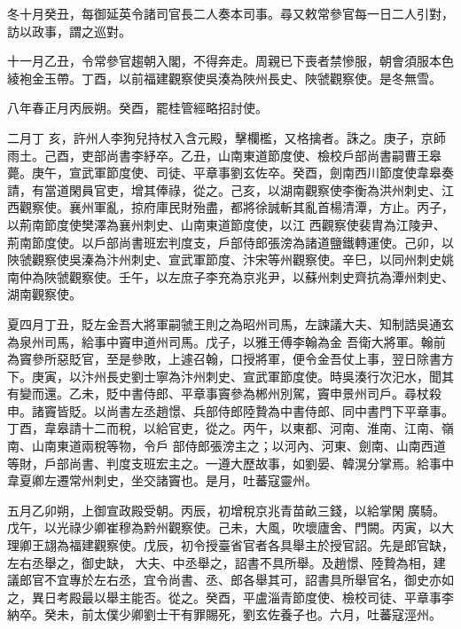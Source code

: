\begin{pinyinscope}
 冬十月癸丑，每御延英令諸司官長二人奏本司事。尋又敕常參官每一日二人引對，訪以政事，謂之巡對。



 十一月乙丑，令常參官趨朝入閣，不得奔走。周親已下喪者禁慘服，朝會須服本色綾袍金玉帶。丁酉，以前福建觀察使吳湊為陜州長史、陜虢觀察使。是冬無雪。



 八年春正月丙辰朔。癸酉，罷桂管經略招討使。



 二月丁
 亥，許州人李狗兒持杖入含元殿，擊欄檻，又格擒者。誅之。庚子，京師雨土。己酉，吏部尚書李紓卒。乙丑，山南東道節度使、檢校戶部尚書嗣曹王皋薨。庚午，宣武軍節度使、司徒、平章事劉玄佐卒。癸酉，劍南西川節度使韋皋奏請，有當道閑員官吏，增其俸祿，從之。己亥，以湖南觀察使李衡為洪州刺史、江西觀察使。襄州軍亂，掠府庫民財殆盡，都將徐誠斬其亂首楊清潭，方止。丙子，以荊南節度使樊澤為襄州刺史、山南東道節度使，以江
 西觀察使裴胄為江陵尹、荊南節度使。以戶部尚書班宏判度支，戶部侍郎張滂為諸道鹽鐵轉運使。己卯，以陜虢觀察使吳溱為汴州刺史、宣武軍節度、汴宋等州觀察使。辛巳，以同州刺史姚南仲為陜虢觀察使。壬午，以左庶子李充為京兆尹，以蘇州刺史齊抗為潭州刺史、湖南觀察使。



 夏四月丁丑，貶左金吾大將軍嗣虢王則之為昭州司馬，左諫議大夫、知制誥吳通玄為泉州司馬，給事中竇申道州司馬。戊子，以雅王傅李翰為金
 吾衛大將軍。翰前為竇參所惡貶官，至是參敗，上遽召翰，口授將軍，便令金吾仗上事，翌日除書方下。庚寅，以汴州長史劉士寧為汴州刺史、宣武軍節度使。時吳湊行次汜水，聞其有變而還。乙未，貶中書侍郎、平章事竇參為郴州別駕，竇申景州司戶。尋杖殺申。諸竇皆貶。以尚書左丞趙憬、兵部侍郎陸贄為中書侍郎、同中書門下平章事。丁酉，韋皋請十二而稅，以給官吏，從之。丙午，以東都、河南、淮南、江南、嶺南、山南東道兩稅等物，令戶
 部侍郎張滂主之；以河內、河東、劍南、山南西道等財，戶部尚書、判度支班宏主之。一遵大歷故事，如劉晏、韓滉分掌焉。給事中韋夏卿左遷常州刺史，坐交諸竇也。是月，吐蕃寇靈州。



 五月乙卯朔，上御宣政殿受朝。丙辰，初增稅京兆青苗畝三錢，以給掌閑廣騎。戊午，以光祿少卿崔穆為黔州觀察使。己未，大風，吹壞廬舍、門闕。丙寅，以大理卿王翃為福建觀察使。戊辰，初令授臺省官者各具舉主於授官詔。先是郎官缺，左右丞舉之，御史缺，
 大夫、中丞舉之，詔書不具所舉。及趙憬、陸贄為相，建議郎官不宜專於左右丞，宜令尚書、丞、郎各舉其可，詔書具所舉官名，御史亦如之，異日考殿最以舉主能否。從之。癸酉，平盧淄青節度使、檢校司徒、平章事李納卒。癸未，前太僕少卿劉士干有罪賜死，劉玄佐養子也。六月，吐蕃寇涇州。




\end{pinyinscope}
